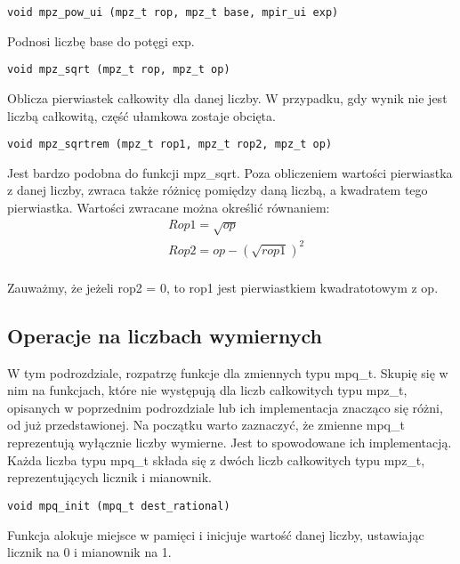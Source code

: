 \documentclass[twoside,a4paper]{book}
\begin{document}
\begin{lstlisting}
void mpz_pow_ui (mpz_t rop, mpz_t base, mpir_ui exp)
\end{lstlisting}

Podnosi liczbę base do potęgi exp.

\begin{lstlisting}
void mpz_sqrt (mpz_t rop, mpz_t op)
\end{lstlisting}

Oblicza pierwiastek całkowity dla danej liczby. W przypadku, gdy wynik nie jest liczbą całkowitą, część ułamkowa zostaje obcięta.

\begin{lstlisting}
void mpz_sqrtrem (mpz_t rop1, mpz_t rop2, mpz_t op)
\end{lstlisting}

Jest bardzo podobna do funkcji mpz\_sqrt. Poza obliczeniem wartości pierwiastka z danej liczby, zwraca także różnicę pomiędzy daną liczbą, a kwadratem tego pierwiastka. Wartości zwracane można określić równaniem:
\begin{equation}
\begin{split}
&Rop1 = \sqrt{op} \\
&Rop2 = op - (\sqrt{rop1})^2 \\
\end{split}
\end{equation}

Zauważmy, że jeżeli rop2 = 0, to rop1 jest pierwiastkiem kwadratotowym z op.

\subsection{Operacje na liczbach wymiernych}

W tym podrozdziale, rozpatrzę funkcje dla zmiennych typu mpq\_t. Skupię się w nim na funkcjach, które nie występują dla liczb całkowitych typu mpz\_t, opisanych w poprzednim podrozdziale lub ich implementacja znacząco się różni, od już przedstawionej.
Na początku warto zaznaczyć, że zmienne mpq\_t reprezentują wyłącznie liczby wymierne. Jest to spowodowane ich implementacją. Każda liczba typu mpq\_t składa się z dwóch liczb całkowitych typu mpz\_t, reprezentujących licznik i mianownik.

\begin{lstlisting}
void mpq_init (mpq_t dest_rational)
\end{lstlisting}

Funkcja alokuje miejsce w pamięci i inicjuje wartość danej liczby, ustawiając licznik na 0 i mianownik na 1.
\end{document}
